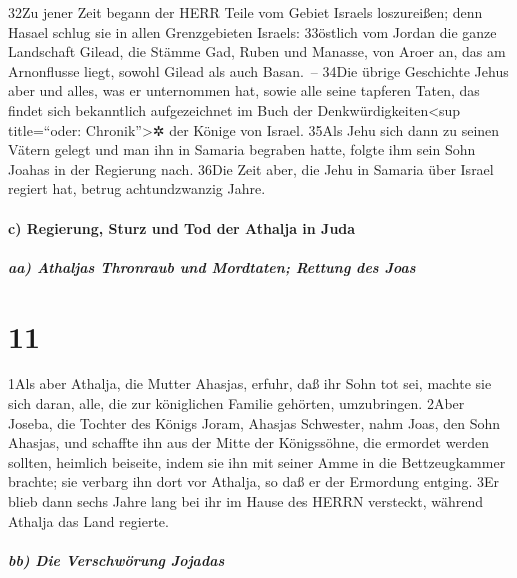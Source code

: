 32Zu jener Zeit begann der HERR Teile vom Gebiet Israels loszureißen;
denn Hasael schlug sie in allen Grenzgebieten Israels: 33östlich vom
Jordan die ganze Landschaft Gilead, die Stämme Gad, Ruben und Manasse,
von Aroer an, das am Arnonflusse liegt, sowohl Gilead als auch Basan.~--
34Die übrige Geschichte Jehus aber und alles, was er unternommen hat,
sowie alle seine tapferen Taten, das findet sich bekanntlich
aufgezeichnet im Buch der Denkwürdigkeiten\textless sup title=``oder:
Chronik''\textgreater✲ der Könige von Israel. 35Als Jehu sich dann zu
seinen Vätern gelegt und man ihn in Samaria begraben hatte, folgte ihm
sein Sohn Joahas in der Regierung nach. 36Die Zeit aber, die Jehu in
Samaria über Israel regiert hat, betrug achtundzwanzig Jahre.

\hypertarget{c-regierung-sturz-und-tod-der-athalja-in-juda}{%
\paragraph{c) Regierung, Sturz und Tod der Athalja in
Juda}\label{c-regierung-sturz-und-tod-der-athalja-in-juda}}

\hypertarget{aa-athaljas-thronraub-und-mordtaten-rettung-des-joas}{%
\subparagraph{aa) Athaljas Thronraub und Mordtaten; Rettung des
Joas}\label{aa-athaljas-thronraub-und-mordtaten-rettung-des-joas}}

\hypertarget{section-10}{%
\section{11}\label{section-10}}

1Als aber Athalja, die Mutter Ahasjas, erfuhr, daß ihr Sohn tot sei,
machte sie sich daran, alle, die zur königlichen Familie gehörten,
umzubringen. 2Aber Joseba, die Tochter des Königs Joram, Ahasjas
Schwester, nahm Joas, den Sohn Ahasjas, und schaffte ihn aus der Mitte
der Königssöhne, die ermordet werden sollten, heimlich beiseite, indem
sie ihn mit seiner Amme in die Bettzeugkammer brachte; sie verbarg ihn
dort vor Athalja, so daß er der Ermordung entging. 3Er blieb dann sechs
Jahre lang bei ihr im Hause des HERRN versteckt, während Athalja das
Land regierte.

\hypertarget{bb-die-verschwuxf6rung-jojadas}{%
\subparagraph{bb) Die Verschwörung
Jojadas}\label{bb-die-verschwuxf6rung-jojadas}}

